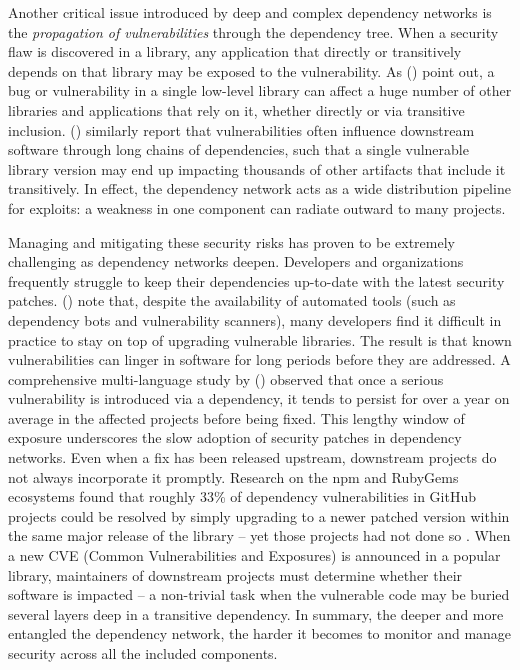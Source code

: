 \documentclass[12pt,a4paper]{report}
\begin{document}
Another critical issue introduced by deep and complex dependency networks is the \emph{propagation of vulnerabilities} through the dependency tree. When a security flaw is discovered in a library, any application that directly or transitively depends on that library may be exposed to the vulnerability. As \citeauthor{boldiFineGrainedNetworkAnalysis2020} (\citeyear{boldiFineGrainedNetworkAnalysis2020}) point out, a bug or vulnerability in a single low-level library can affect a huge number of other libraries and applications that rely on it, whether directly or via transitive inclusion. \citeauthor{dusingAnalyzingDirectTransitive2022} (\citeyear{dusingAnalyzingDirectTransitive2022}) similarly report that vulnerabilities often influence downstream software through long chains of dependencies, such that a single vulnerable library version may end up impacting thousands of other artifacts that include it transitively. In effect, the dependency network acts as a wide distribution pipeline for exploits: a weakness in one component can radiate outward to many projects. 


Managing and mitigating these security risks has proven to be extremely challenging as dependency networks deepen. Developers and organizations frequently struggle to keep their dependencies up-to-date with the latest security patches. \citeauthor{dusingAnalyzingDirectTransitive2022} (\citeyear{dusingAnalyzingDirectTransitive2022}) note that, despite the availability of automated tools (such as dependency bots and vulnerability scanners), many developers find it difficult in practice to stay on top of upgrading vulnerable libraries. The result is that known vulnerabilities can linger in software for long periods before they are addressed. A comprehensive multi-language study by \citeauthor{kumarComprehensiveStudyImpact2024} (\citeyear{kumarComprehensiveStudyImpact2024}) observed that once a serious vulnerability is introduced via a dependency, it tends to persist for over a year on average in the affected projects before being fixed. This lengthy window of exposure underscores the slow adoption of security patches in dependency networks. Even when a fix has been released upstream, downstream projects do not always incorporate it promptly. Research on the npm and RubyGems ecosystems found that roughly 33\% of dependency vulnerabilities in GitHub projects could be resolved by simply upgrading to a newer patched version within the same major release of the library – yet those projects had not done so \parencite{zeroualiImpactSecurityVulnerabilities2022a}. When a new CVE (Common Vulnerabilities and Exposures) is announced in a popular library, maintainers of downstream projects must determine whether their software is impacted – a non-trivial task when the vulnerable code may be buried several layers deep in a transitive dependency. In summary, the deeper and more entangled the dependency network, the harder it becomes to monitor and manage security across all the included components.
\end{document}
